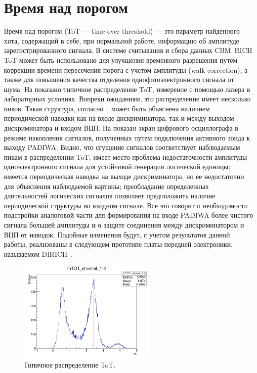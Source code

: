 \section{Время над порогом}\label{section:secToT}

Время над порогом (ToT --- time over threshold) --- это параметр найденного хита, содержащий в себе, при нормальной работе, информацию об амплитуде зарегистрированного сигнала. В системе считывания и сбора данных CBM~RICH ToT может быть использовано для улучшения временного разрешения путём коррекции времени пересечения порога с учетом амплитуды (walk correction), а также для повышения качества отделения однофотоэлектронного сигнала от шума. На  показано типичное распределение ToT, измереное с помощью лазера в лабораторных условиях. Вопреки ожиданиям, это распределение имеет несколько пиков. Такая структура, согласно~\cite{ToTinNoise}, может быть объяснена наличием периодической наводки как на входе дискриминатора, так и между выходом дискриминатора и входом ВЦП. На  показан экран цифрового осциллографа в режиме накопления сигналов, полученных путем подключения активного зонда к выходу PADIWA. Видно, что сгущение сигналов соответствует наблюдаемым пикам в распределении ToT; имеет место проблема недостаточности амплитуды одноэлектронного сигнала для устойчивой генерации логической единицы; имеется периодическая наводка на выходе дискриминатора, но ее недостаточно для объяснения наблюдаемой картины; преобладание определенных длительностей логических сигналов позволяет предположить наличие периодической структуры во входном сигнале. Все это говорит о необходимости подстройки аналоговой части для формирования на входе PADIWA более чистого сигнала большей амплитуды и о защите соединения между дискриминатором и ВЦП от наводок. Подобные изменения будут, с учетом результатов данной работы, реализованы в следующем прототипе платы передней электроники, называемом DIRICH~\cite{DIRICH}.

\begin{figure}[H]
\centering
\includegraphics[width=0.6\textwidth]{pictures/29_Scope_vs_data-data.png}
\caption{Типичное распределение ToT.}
\label{fig:ToTdata}
\end{figure}

